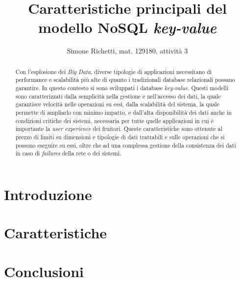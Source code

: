 \documentclass[a4paper, 12pt]{article}
\title{\bf Caratteristiche principali del modello NoSQL \textit{key-value}}
\author{Simone Richetti, mat. 129180, attività 3}
\date{}
\begin{document}
\maketitle

\begingroup{}
\begin{abstract}
Con l'esplosione dei \textit{Big Data}, diverse tipologie di applicazioni necessitano di performance e scalabilità più alte di quanto i tradizionali database relazionali possano garantire. In questo contesto si sono sviluppati i database \textit{key-value}. Questi modelli sono caratterizzati dalla semplicità nella gestione e nell'accesso dei dati, la quale garantisce velocità nelle operazioni su essi, dalla scalabilità del sistema, la quale permette di ampliarlo con minimo impatto, e dall'alta disponibilità dei dati anche in condizioni critiche dei sistemi, necessaria per tutte quelle applicazioni in cui è importante la \textit{user experience} dei fruitori. Queste caratteristiche sono ottenute al prezzo di limiti su dimensioni e tipologie di dati trattabili e sulle operazioni che si possono eseguire su essi, oltre che ad una complessa gestione della consistenza dei dati in caso di \textit{failures} della rete o dei sistemi.
\end{abstract}\endgroup

\section{Introduzione}


\section{Caratteristiche}


\section{Conclusioni}


\newpage

\end{document}
